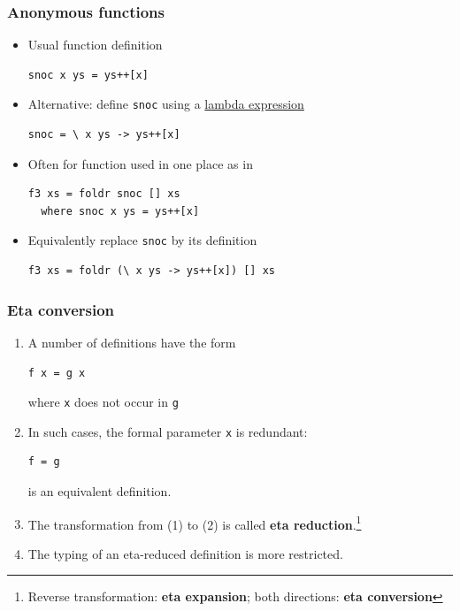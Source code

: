 \documentclass{beamer}
\begin{document}
\begin{frame}[fragile]
  \frametitle{Anonymous functions}
  \begin{itemize}
  \item<+-> Usual function definition
\begin{verbatim}
snoc x ys = ys++[x]
\end{verbatim}
  \item<+->
  Alternative: define \texttt{snoc} using a \href{https://en.wikipedia.org/wiki/Anonymous_function}{lambda expression}
\begin{verbatim}
snoc = \ x ys -> ys++[x]
\end{verbatim}
\item<+->
  Often for function used in one place as in
\begin{verbatim}
f3 xs = foldr snoc [] xs
  where snoc x ys = ys++[x]
\end{verbatim}
\item<+-> Equivalently replace \texttt{snoc} by its definition
\begin{verbatim}
f3 xs = foldr (\ x ys -> ys++[x]) [] xs
\end{verbatim}
\end{itemize}
\end{frame}
\begin{frame}[fragile]
  \frametitle{Eta conversion}
  \begin{enumerate}
  \item A number of definitions have the form
\begin{verbatim}
f x = g x
\end{verbatim}
    where \texttt{x} does not occur in \texttt{g}
  \item 
    In such cases, the formal parameter \texttt{x} is redundant:
\begin{verbatim}
f = g
\end{verbatim}
    is an equivalent definition.
  \item The transformation from (1) to (2) is called \textbf{eta reduction}.\footnote{Reverse transformation: \textbf{eta expansion}; both directions: \textbf{eta conversion}}
  \item The typing of an eta-reduced definition is more restricted.
\end{enumerate}
\end{frame}
\end{document}
